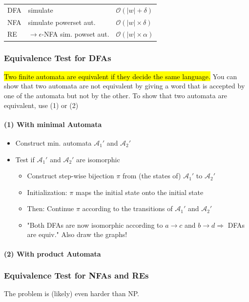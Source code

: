 \documentclass[a3paper, 8pt]{extarticle}
\begin{document}
\begin{multicols*}{6}
\begin{tabular}{l l l}
    DFA & simulate & $\mathcal{O}(|w|+\delta)$\\
    NFA & simulate powerset aut. & $\mathcal{O}(|w|\times \delta)$\\
    RE & $\to \epsilon$-NFA sim. powset aut. & $\mathcal{O}(|w| \times \alpha)$
\end{tabular}

\subsubsection{Equivalence Test for DFAs}
\hl{Two finite automata are equivalent if they decide the same language.} You can show that two automata are not equivalent by giving a word that is accepted by one of the automata but not by the other. To show that two automata are equivalent, use (1) or (2)
\paragraph{(1) With minimal Automata}
\begin{itemize}
    \item Construct min. automata $\mathcal{A}_1'$ and $\mathcal{A}_2'$
    \item Test if $\mathcal{A}_1'$ and $\mathcal{A}_2'$ are isomorphic \begin{itemize}
        \item Construct step-wise bijection $\pi$ from (the states of) $\mathcal{A}_1'$ to $\mathcal{A}_2'$
        \item Initialization: $\pi$ maps the initial state onto the initial state
        \item Then: Continue $\pi$ according to the transitions of $\mathcal{A}_1'$ and $\mathcal{A}_2'$
        \item "Both DFAs are now isomorphic according to $a \to c$ and $b \to d \Rightarrow$ DFAs are equiv." Also draw the graphs!
    \end{itemize}
\end{itemize}

\paragraph{(2) With product Automata}
\subsubsection{Equivalence Test for NFAs and REs}
The problem is (likely) even harder than NP.


\end{multicols*}
\end{document}
